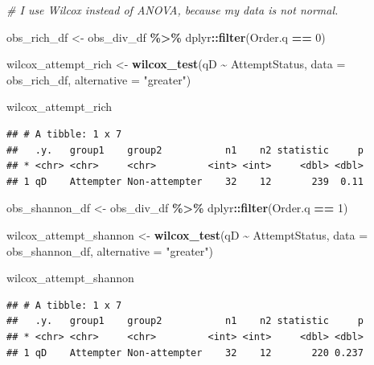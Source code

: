 \documentclass[
]{article}
\newenvironment{Shaded}{\begin{snugshade}}{\end{snugshade}}
\newcommand{\AttributeTok}[1]{\textcolor[rgb]{0.13,0.29,0.53}{#1}}
\newcommand{\CommentTok}[1]{\textcolor[rgb]{0.56,0.35,0.01}{\textit{#1}}}
\newcommand{\DecValTok}[1]{\textcolor[rgb]{0.00,0.00,0.81}{#1}}
\newcommand{\FunctionTok}[1]{\textcolor[rgb]{0.13,0.29,0.53}{\textbf{#1}}}
\newcommand{\NormalTok}[1]{#1}
\newcommand{\OtherTok}[1]{\textcolor[rgb]{0.56,0.35,0.01}{#1}}
\newcommand{\SpecialCharTok}[1]{\textcolor[rgb]{0.81,0.36,0.00}{\textbf{#1}}}
\newcommand{\StringTok}[1]{\textcolor[rgb]{0.31,0.60,0.02}{#1}}
\begin{document}
\begin{Shaded}
\begin{Highlighting}[]
\CommentTok{\# I use Wilcox instead of ANOVA, because my data is not normal.}

\NormalTok{obs\_rich\_df }\OtherTok{\textless{}{-}} 
\NormalTok{  obs\_div\_df }\SpecialCharTok{\%\textgreater{}\%}
\NormalTok{  dplyr}\SpecialCharTok{::}\FunctionTok{filter}\NormalTok{(Order.q }\SpecialCharTok{==} \DecValTok{0}\NormalTok{)}


\NormalTok{wilcox\_attempt\_rich }\OtherTok{\textless{}{-}} 
  \FunctionTok{wilcox\_test}\NormalTok{(qD }\SpecialCharTok{\textasciitilde{}}\NormalTok{ AttemptStatus, }\AttributeTok{data =}\NormalTok{ obs\_rich\_df, }\AttributeTok{alternative =} \StringTok{"greater"}\NormalTok{)}


\NormalTok{wilcox\_attempt\_rich}
\end{Highlighting}
\end{Shaded}

\begin{verbatim}
## # A tibble: 1 x 7
##   .y.   group1    group2           n1    n2 statistic     p
## * <chr> <chr>     <chr>         <int> <int>     <dbl> <dbl>
## 1 qD    Attempter Non-attempter    32    12       239  0.11
\end{verbatim}

\begin{Shaded}
\begin{Highlighting}[]
\NormalTok{obs\_shannon\_df }\OtherTok{\textless{}{-}}
\NormalTok{  obs\_div\_df }\SpecialCharTok{\%\textgreater{}\%}
\NormalTok{  dplyr}\SpecialCharTok{::}\FunctionTok{filter}\NormalTok{(Order.q }\SpecialCharTok{==} \DecValTok{1}\NormalTok{)}

\NormalTok{wilcox\_attempt\_shannon }\OtherTok{\textless{}{-}}
  \FunctionTok{wilcox\_test}\NormalTok{(qD }\SpecialCharTok{\textasciitilde{}}\NormalTok{ AttemptStatus,}
               \AttributeTok{data =}\NormalTok{ obs\_shannon\_df, }\AttributeTok{alternative =} \StringTok{"greater"}\NormalTok{)}

\NormalTok{wilcox\_attempt\_shannon}
\end{Highlighting}
\end{Shaded}

\begin{verbatim}
## # A tibble: 1 x 7
##   .y.   group1    group2           n1    n2 statistic     p
## * <chr> <chr>     <chr>         <int> <int>     <dbl> <dbl>
## 1 qD    Attempter Non-attempter    32    12       220 0.237
\end{verbatim}
\end{document}
